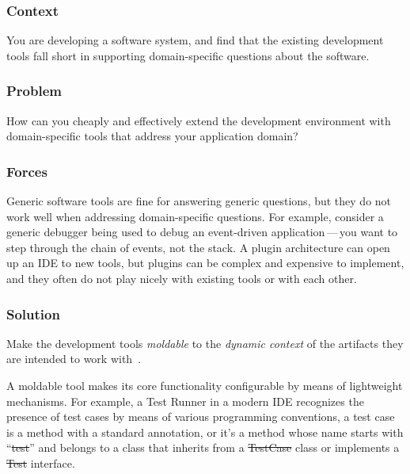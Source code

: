 \documentclass[sigconf]{acmart}
\renewcommand{\nbc}[3]{} %
\newcommand\tk[1]{\nbc{Timo}{#1}{cyan}}
\newcommand\kh[1]{\nbc{Konrad}{#1}{violet}}
\begin{document}
\kh{My main criticism of the overall approach of presenting patterns is that
some of them aren't really patterns. For me, a pattern is something that
has been repeatedly observed in practice. The very first pattern you
present, "Moldable Tool", probably isn't a pattern. How many moldable
tools have been developed? I know of one.}

\subsubsection*{Context}
You are developing a software system, and find that the existing development tools fall short in supporting domain-specific questions about the software.

\subsubsection*{Problem}
How can you cheaply and effectively extend the development environment with domain-specific tools that address your application domain?

\subsubsection*{Forces}
Generic software tools are fine for answering generic questions, but they do not work well when addressing domain-specific questions.
For example, consider a generic debugger being used to debug an event-driven application\,---\,you want to step through the chain of events, not the stack.
A plugin architecture can open up an IDE to new tools, but plugins can be complex and expensive to implement, and they often do not play nicely with existing tools or with each other.

\tk{We call it "the preplanning problem" when discussing frameworks + plug-ins as an implementation option for software product lines. You need to identify all the hot spots for potential extensions in advance, define appropriate extension points, define interfaces which are not too broad and not too narrow, etc.}

\subsubsection*{Solution}
Make the development tools \emph{moldable} to the \emph{dynamic context} of the artifacts they are intended to work with~\cite{Chis17a}.

A moldable tool makes its core functionality configurable by means of lightweight mechanisms.
For example, a Test Runner in a modern IDE recognizes the presence of test cases by means of various programming conventions, \ie a test case is a method with a standard annotation, or it's a method whose name starts with ``\st{test}'' and belongs to a class that inherits from a \st{TestCase} class or implements a \st{Test} interface.
\end{document}

